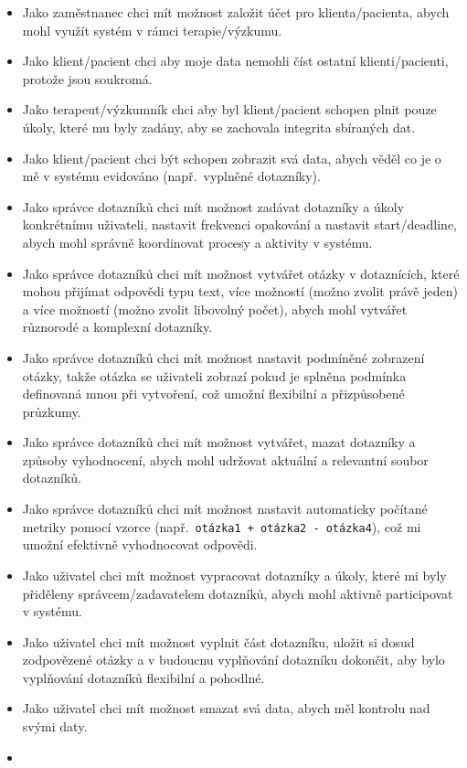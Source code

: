 \begin{itemize}
  \item
  Jako zaměstnanec chci mít možnost založit účet pro klienta/pacienta, abych mohl využít systém v rámci terapie/výzkumu.
  \item
  Jako klient/pacient chci aby moje data nemohli číst ostatní klienti/pacienti, protože jsou soukromá.
  \item
  Jako terapeut/výzkumník chci aby byl klient/pacient schopen plnit pouze úkoly, které mu byly zadány, aby se zachovala integrita sbíraných dat.
  \item
  Jako klient/pacient chci být schopen zobrazit svá data, abych věděl co je o mě v systému evidováno (např.\ vyplněné dotazníky).
  \item
  Jako správce dotazníků chci mít možnost zadávat dotazníky a úkoly konkrétnímu uživateli, nastavit frekvenci opakování a nastavit start/deadline, abych mohl správně koordinovat procesy a aktivity v systému.
  \item
  Jako správce dotazníků chci mít možnost vytvářet otázky v dotaznících, které mohou přijímat odpovědi typu text, více možností (možno zvolit právě jeden) a více možností (možno zvolit libovolný počet), abych mohl vytvářet různorodé a komplexní dotazníky.
  \item
  Jako správce dotazníků chci mít možnost nastavit podmíněné zobrazení otázky, takže otázka se uživateli zobrazí pokud je splněna podmínka definovaná mnou při vytvoření, což umožní flexibilní a přizpůsobené průzkumy.
  \item
  Jako správce dotazníků chci mít možnost vytvářet, mazat dotazníky a způsoby vyhodnocení, abych mohl udržovat aktuální a relevantní soubor dotazníků.
  \item
  Jako správce dotazníků chci mít možnost nastavit automaticky počítané metriky pomocí vzorce (např.\ \texttt{otázka1 + otázka2 - otázka4}), což mi umožní efektivně vyhodnocovat odpovědi.
  \item
  Jako uživatel chci mít možnost vypracovat dotazníky a úkoly, které mi byly přiděleny správcem/zadavatelem dotazníků, abych mohl aktivně participovat v systému.
  \item
  Jako uživatel chci mít možnost vyplnit část dotazníku, uložit si dosud zodpovězené otázky a v budoucnu vyplňování dotazníku dokončit, aby bylo vyplňování dotazníků flexibilní a pohodlné.
  \item
  Jako uživatel chci mít možnost smazat svá data, abych měl kontrolu nad svými daty.
  \item

\end{itemize}
